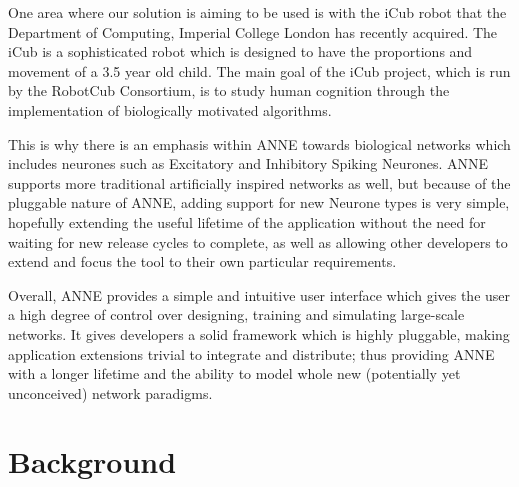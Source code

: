 \documentclass{acm_proc_article-sp}
\begin{document}
{One area where our solution is aiming to be used is with the iCub robot that the Department of Computing, Imperial College London has recently acquired. The iCub is a sophisticated robot which is designed to have the proportions and movement of a 3.5 year old child. The main goal of the iCub project, which is run by the RobotCub Consortium\cite{robotcub}, is to study human cognition through the implementation of biologically motivated algorithms.

This is why there is an emphasis within ANNE towards biological networks which includes neurones such as Excitatory and Inhibitory Spiking Neurones. ANNE supports more traditional artificially inspired networks as well, but because of the pluggable nature of ANNE, adding support for new Neurone types is very simple, hopefully extending the useful lifetime of the application without the need for waiting for new release cycles to complete, as well as allowing other developers to extend and focus the tool to their own particular requirements.

Overall, ANNE provides a simple and intuitive user interface which gives the user a high degree of control over designing, training and simulating large{}-scale networks. It gives developers a solid framework which is highly pluggable, making application extensions trivial to integrate and distribute; thus providing ANNE with a longer lifetime and the ability to model whole new (potentially yet unconceived) network paradigms.
}

\section{Background}
\end{document}
